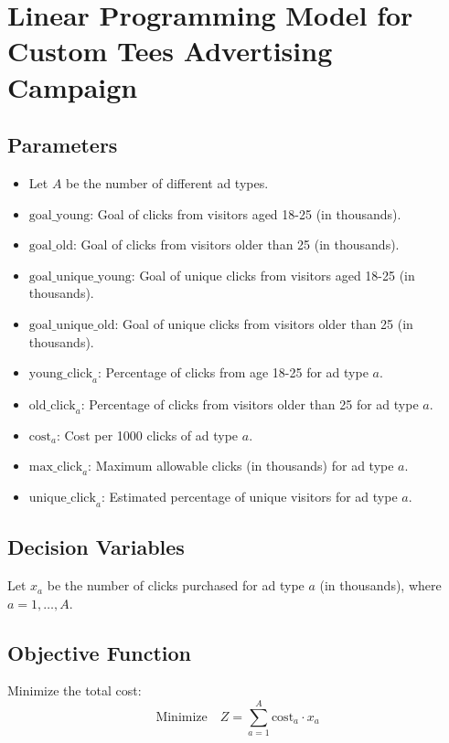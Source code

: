 \documentclass{article}
\begin{document}
\section*{Linear Programming Model for Custom Tees Advertising Campaign}

\subsection*{Parameters}
\begin{itemize}
    \item Let \( A \) be the number of different ad types.
    \item \( \text{goal\_young} \): Goal of clicks from visitors aged 18-25 (in thousands).
    \item \( \text{goal\_old} \): Goal of clicks from visitors older than 25 (in thousands).
    \item \( \text{goal\_unique\_young} \): Goal of unique clicks from visitors aged 18-25 (in thousands).
    \item \( \text{goal\_unique\_old} \): Goal of unique clicks from visitors older than 25 (in thousands).
    \item \( \text{young\_click}_{a} \): Percentage of clicks from age 18-25 for ad type \( a \).
    \item \( \text{old\_click}_{a} \): Percentage of clicks from visitors older than 25 for ad type \( a \).
    \item \( \text{cost}_{a} \): Cost per 1000 clicks of ad type \( a \).
    \item \( \text{max\_click}_{a} \): Maximum allowable clicks (in thousands) for ad type \( a \).
    \item \( \text{unique\_click}_{a} \): Estimated percentage of unique visitors for ad type \( a \).
\end{itemize}

\subsection*{Decision Variables}
Let \( x_a \) be the number of clicks purchased for ad type \( a \) (in thousands), where \( a = 1, \ldots, A \).

\subsection*{Objective Function}
Minimize the total cost:
\[
\text{Minimize} \quad Z = \sum_{a=1}^{A} \text{cost}_{a} \cdot x_a
\]
\end{document}
